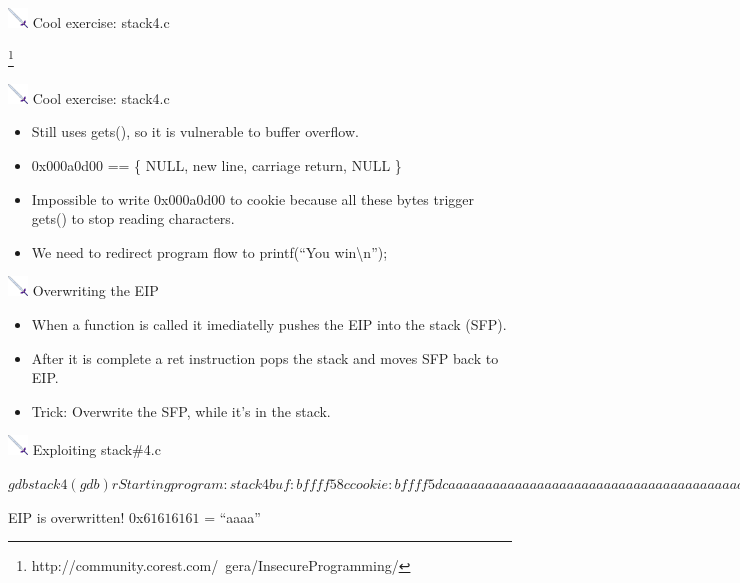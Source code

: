 \documentclass{beamer}
\newcommand{\sword}{\includegraphics[width=15pt]{sword.png} \hspace*{5pt}}
\begin{document}
\begin{frame}{\sword Cool exercise: stack4.c}

\let\thefootnote\relax\footnote{\tiny http://community.corest.com/~gera/InsecureProgramming/}
\end{frame}
\begin{frame}{\sword Cool exercise: stack4.c}

\begin{itemize}
\item Still uses gets(), so it is vulnerable to buffer overflow.
\item 0x000a0d00 == \{ NULL, new line, carriage return, NULL \}
\item Impossible to write 0x000a0d00 to cookie because all these bytes trigger gets() to stop reading characters.
\item We need to redirect program flow to printf(``You win\textbackslash n'');
\end{itemize}
\end{frame}
\begin{frame}{\sword Overwriting the EIP}

\begin{itemize}
\item When a function is called it imediatelly pushes the EIP into the stack (SFP). \\
\item After it is complete a {\color{blue}ret} instruction pops the stack and moves SFP back to EIP. \\
\item Trick: Overwrite the SFP, while it's in the stack.
\end{itemize}
\end{frame}
\begin{frame}[fragile]{\sword Exploiting stack\#4.c}
\begin{terminal}
$ gdb stack4
(gdb) r 
Starting program: stack4 
buf: bffff58c cookie: bffff5dc 
aaaaaaaaaaaaaaaaaaaaaaaaaaaaaaaaaaaaaaaaaaaaaaaaaaaa...
Program received signal SIGSEGV, Segmentation fault.
0x61616161 in ?? ()
$
\end{terminal} 

\vspace*{0.5cm}
EIP is overwritten! $0$x$61616161$ = ``aaaa''\\

\end{frame}
\end{document}
